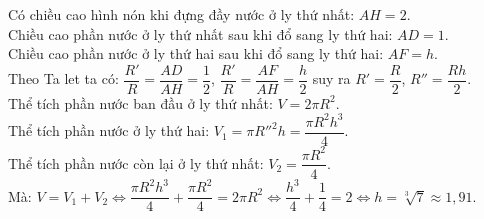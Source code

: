 \begin{ex}
{\begin{center}
		\end{center}
		Có chiều cao hình nón khi đựng đầy nước ở ly thứ nhất: $AH=2$.\\
		Chiều cao phần nước ở ly thứ nhất sau khi đổ sang ly thứ hai: $AD=1$.\\
		Chiều cao phần nước ở ly thứ hai sau khi đổ sang ly thứ hai: $AF=h$.\\
		Theo Ta let ta có: $\dfrac{R'}{R}=\dfrac{AD}{AH}=\dfrac{1}{2}$, $\dfrac{R'}{R}=\dfrac{AF}{AH}=\dfrac{h}{2}$ suy ra $R'=\dfrac{R}{2}$, $R''=\dfrac{Rh}{2}$.\\
		Thể tích phần nước ban đầu ở ly thứ nhất: $V=2\pi R^2$.\\
		Thể tích phần nước ở ly thứ hai: $V_1=\pi R''^2h =\dfrac{\pi R^2h^3}{4}$.\\
		Thể tích phần nước còn lại ở ly thứ nhất: $V_2=\dfrac{\pi R^2}{4}$.\\
		Mà: $V=V_1+V_2\Leftrightarrow\dfrac{\pi R^2h^3}{4}+\dfrac{\pi R^2}{4}=2\pi R^2\Leftrightarrow\dfrac{h^3}{4}+\dfrac{1}{4}=2\Leftrightarrow h=\sqrt[3]{7}\approx 1,91$.}
\end{ex}
